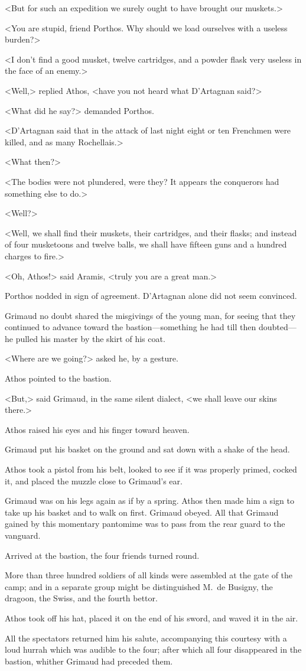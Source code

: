 <But for such an expedition we surely ought to have brought our muskets.> 

<You are stupid, friend Porthos. Why should we load ourselves with a useless burden?> 

<I don't find a good musket, twelve cartridges, and a powder flask very useless in the face of an enemy.> 

<Well,> replied Athos, <have you not heard what D'Artagnan said?> 

<What did he say?> demanded Porthos. 

<D'Artagnan said that in the attack of last night eight or ten Frenchmen were killed, and as many Rochellais.> 

<What then?> 

<The bodies were not plundered, were they? It appears the conquerors had something else to do.> 

<Well?> 

<Well, we shall find their muskets, their cartridges, and their flasks; and instead of four musketoons and twelve balls, we shall have fifteen guns and a hundred charges to fire.> 

<Oh, Athos!> said Aramis, <truly you are a great man.> 

Porthos nodded in sign of agreement. D'Artagnan alone did not seem convinced. 

Grimaud no doubt shared the misgivings of the young man, for seeing that they continued to advance toward the bastion—something he had till then doubted—he pulled his master by the skirt of his coat. 

<Where are we going?> asked he, by a gesture. 

Athos pointed to the bastion. 

<But,> said Grimaud, in the same silent dialect, <we shall leave our skins there.> 

Athos raised his eyes and his finger toward heaven. 

Grimaud put his basket on the ground and sat down with a shake of the head. 

Athos took a pistol from his belt, looked to see if it was properly primed, cocked it, and placed the muzzle close to Grimaud's ear. 

Grimaud was on his legs again as if by a spring. Athos then made him a sign to take up his basket and to walk on first. Grimaud obeyed. All that Grimaud gained by this momentary pantomime was to pass from the rear guard to the vanguard. 

Arrived at the bastion, the four friends turned round. 

More than three hundred soldiers of all kinds were assembled at the gate of the camp; and in a separate group might be distinguished M.~de Busigny, the dragoon, the Swiss, and the fourth bettor. 

Athos took off his hat, placed it on the end of his sword, and waved it in the air. 

All the spectators returned him his salute, accompanying this courtesy with a loud hurrah which was audible to the four; after which all four disappeared in the bastion, whither Grimaud had preceded them.